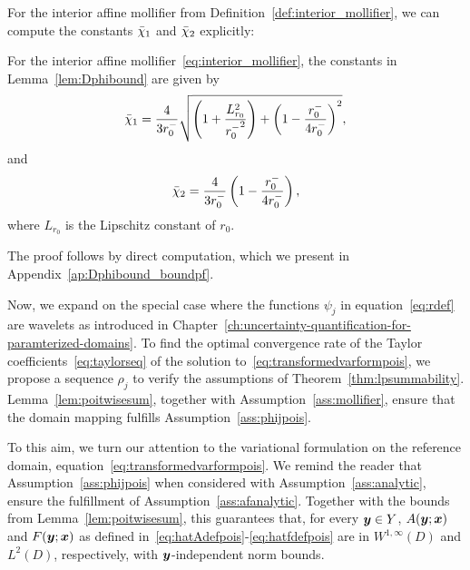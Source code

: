 For the interior affine mollifier from Definition~\ref{def:interior_mollifier}, we can compute the constants $\bar{\chi}_1$ and $\bar{\chi}_2$ explicitly:
\begin{corollary}
    \label{cor:chi_bounds_interior_corollary}
    For the interior affine mollifier~\eqref{eq:interior_mollifier}, the constants in Lemma~\ref{lem:Dphibound} are given by
    \begin{equation}
        \bar{\chi}_1  = \frac{4}{3{r_0^-}} \sqrt{ \left( 1+ \frac{L_{r_0} ^2}{{r_0^-}^2}    \right) + \left(1 - \frac{r_0^-}{4r_0^-}\right)^2 },\label{eq:chibarone}
    \end{equation}
    and
    \begin{equation}
        \bar{\chi}_2 = \frac{4}{{3r_0^-}} \left(1 - \frac{r_0^-}{4r_0^-}\right),\label{eq:chibartwo}
    \end{equation}
    where $L_{r_0}$ is the Lipschitz constant of $r_0$.
\end{corollary}
The proof follows by direct computation, which we present in Appendix~\ref{ap:Dphibound_boundpf}.

Now, we expand on the special case where the functions $\psi_j$ in equation~\eqref{eq:rdef} are wavelets as introduced in Chapter~\ref{ch:uncertainty-quantification-for-paramterized-domains}.
To find the optimal convergence rate of the Taylor coefficients~\eqref{eq:taylorseq} of the solution to~\eqref{eq:transformedvarformpois}, we propose a sequence $\rho_j$ to verify the assumptions of Theorem~\ref{thm:lpsummability}.
Lemma~\ref{lem:poitwisesum}, together with Assumption~\ref{ass:mollifier}, ensure that the domain mapping fulfills Assumption~\ref{ass:phijpois}.

To this aim, we turn our attention to the variational formulation on the reference domain, equation~\eqref{eq:transformedvarformpois}.
We remind the reader that Assumption~\ref{ass:phijpois} when considered with Assumption~\ref{ass:analytic}, ensure the fulfillment of Assumption~\ref{ass:afanalytic}.
Together with the bounds from Lemma~\ref{lem:poitwisesum},  this guarantees that, for every ${\bm{y}}\in Y$, $A({\bm{y}}; {{\bm{x}}})$ and $F({\bm{y}};{{\bm{x}}})$ as defined in~\eqref{eq:hatAdefpois}-\eqref{eq:hatfdefpois} are in $W^{1,\infty}(D)$ and $L^2(D)$, respectively, with ${\bm{y}}$-independent norm bounds.

